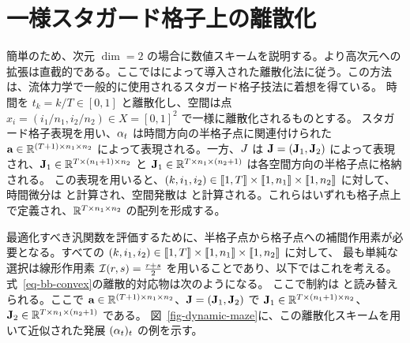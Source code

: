 \section{一様スタガード格子上の離散化}

簡単のため、次元 $\dim=2$ の場合に数値スキームを説明する。より高次元への拡張は直截的である。ここでは\citet{FPapPeyOud13}によって導入された離散化法に従う。この方法は、流体力学で一般的に使用されるスタガード格子技法に着想を得ている。
時間を $t_k = k/T \in [0,1]$ と離散化し、空間は点 $x_i = (i_1/n_1,i_2/n_2) \in X = [0,1]^2$ で一様に離散化されるものとする。
スタガード格子表現を用い、$\alpha_t$ は時間方向の半格子点に関連付けられた $\mathrm{\textbf{a}} \in \mathbb{R}^{(T+1) \times n_1 \times n_2}$ によって表現される。一方、$J$ は $\mathrm{\textbf{J}}=(\mathrm{\textbf{J}}_1,\mathrm{\textbf{J}}_2)$ によって表現され、$\mathrm{\textbf{J}}_1 \in \mathbb{R}^{T \times (n_1+1) \times n_2}$ と $\mathrm{\textbf{J}}_1 \in \mathbb{R}^{T \times n_1 \times (n_2+1)}$ は各空間方向の半格子点に格納される。
この表現を用いると、$(k,i_1,i_2) \in \llbracket1,T\rrbracket \times \llbracket1,n_1\rrbracket \times \llbracket1,n_2\rrbracket$ に対して、時間微分は
と計算され、空間発散は
と計算される。これらはいずれも格子点上で定義され、$\mathbb{R}^{T \times n_1 \times n_2}$ の配列を形成する。

最適化すべき汎関数を評価するために、半格子点から格子点への補間作用素が必要となる。すべての $(k,i_1,i_2) \in \llbracket1,T\rrbracket \times \llbracket1,n_1\rrbracket \times \llbracket1,n_2\rrbracket$ に対して、
最も単純な選択は線形作用素 $\mathcal{I}(r,s)=\frac{r+s}{2}$ を用いることであり、以下ではこれを考える。式~\eqref{eq-bb-convex}の離散的対応物は次のようになる。
ここで制約は
と読み替えられる。ここで $\mathrm{\textbf{a}} \in \mathbb{R}^{(T+1) \times n_1 \times n_2}$、$\mathrm{\textbf{J}}=(\mathrm{\textbf{J}}_1,\mathrm{\textbf{J}}_2)$ で $\mathrm{\textbf{J}}_1 \in \mathbb{R}^{T \times (n_1+1) \times n_2}$、$\mathrm{\textbf{J}}_2 \in \mathbb{R}^{T \times n_1 \times (n_2+1)}$ である。
図~\ref{fig-dynamic-maze}に、この離散化スキームを用いて近似された発展 $(\alpha_t)_t$ の例を示す。

